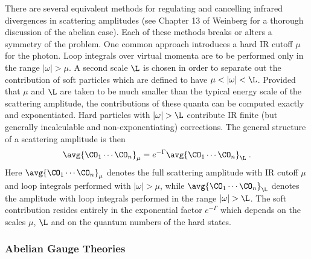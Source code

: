 \documentclass[11pt]{article}
\def\G{{\Gamma}}
\def\o{{\omega}}
\begin{document}
There are several equivalent methods for regulating and cancelling infrared divergences in scattering amplitudes (see Chapter 13 of Weinberg \cite{Weinberg:1995mt} for a thorough discussion of the abelian case). Each of these methods breaks or alters a symmetry of the problem. One common approach introduces a hard IR cutoff $\mu$ for the photon. Loop integrals over virtual momenta are to be performed only in the range $|\o| > \mu$. A second scale $\L$ is chosen in order to separate out the contribution of soft particles which are defined to have $\mu < |\o| < \L$. Provided that  $\mu$ and $\L$ are taken to be much smaller than the typical energy scale of the scattering amplitude, the contributions of these quanta can be computed exactly and exponentiated. Hard particles with $|\o| > \L$ contribute IR finite (but generally incalculable and non-exponentiating) corrections. The general structure of a scattering amplitude is then
\begin{equation}
\begin{split}\label{IRgen}
\avg{ \CO_1 \cdots \CO_n }_\mu  = e^{ - \G } \avg{ \CO_1 \cdots \CO_n }_\L \; . 
\end{split}
\end{equation}
Here $\avg{ \CO_1 \cdots \CO_n }_\mu $ denotes the full scattering amplitude with IR cutoff $\mu$ and loop integrals performed with $|\o| > \mu$, while $\avg{ \CO_1 \cdots \CO_n }_\L$ denotes the amplitude with loop integrals performed in the range $|\o| > \L$. The soft  contribution resides entirely in the exponential factor $e^{-\G}$ which depends on the scales $\mu$, $\L$ and on the quantum numbers of the hard states. 


\subsubsection*{Abelian Gauge Theories}
\label{sec:IRdivabelian}
\end{document}
